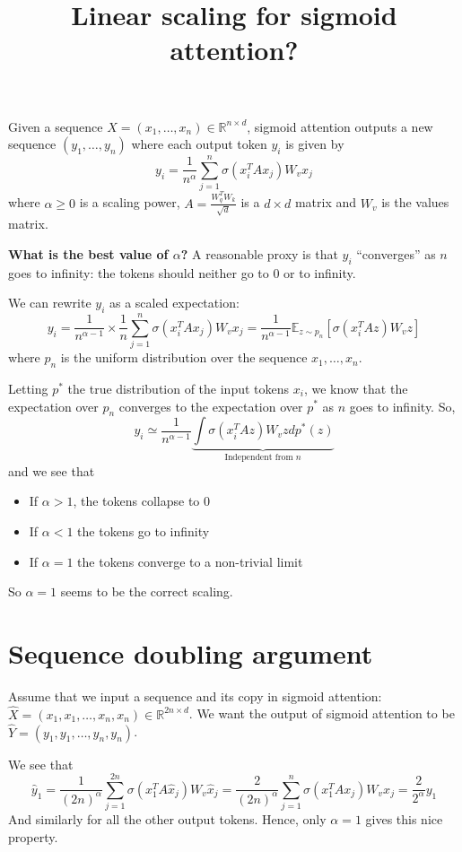 \documentclass{article}
\title{Linear scaling for sigmoid attention?}
\author{}
\date{}
\begin{document}
\maketitle



Given a sequence $X = (x_1, \dots, x_n)\in\mathbb{R}^{n\times d}$, sigmoid attention outputs a new sequence $(y_1, \dots, y_n)$ where each output token $y_i$ is given by 
$$
y_i = \frac1{n^\alpha}\sum_{j=1}^n\sigma(x_i^TAx_j)W_vx_j
$$
where $\alpha\geq0$ is a scaling power, $A = \frac{W_q^TW_k}{\sqrt{d}}$ is a $d\times d$ matrix and $W_v$ is the values matrix.

\textbf{What is the best value of $\alpha$?}
A reasonable proxy is that $y_i$ ``converges'' as $n$ goes to infinity: the tokens should neither go to $0$ or to infinity.

We can rewrite $y_i$ as a scaled expectation:
$$
y_i = \frac1{n^{\alpha-1}}\times \frac1n\sum_{j=1}^n\sigma(x_i^TAx_j)W_vx_j = \frac1{n^{\alpha-1}}\mathbb{E}_{z\sim p_n}\left[\sigma(x_i^TAz)W_vz\right]
$$
where $p_n$ is the uniform distribution over the sequence $x_1, \dots, x_n$.

Letting $p^*$ the true distribution of the input tokens $x_i$, we know that the expectation over $p_n$ converges to the expectation over $p^*$ as $n$ goes to infinity. So, 
$$
y_i\simeq \frac1{n^{\alpha-1}} \underbrace{\int\sigma(x_i^TAz)W_vz dp^*(z)}_{\text{Independent from }n}
$$
and we see that
\begin{itemize}
    \item If $\alpha > 1$, the tokens collapse to 0
    \item If $\alpha < 1$ the tokens go to infinity
    \item If $\alpha=1$ the tokens converge to a non-trivial limit
\end{itemize}
So $\alpha=1$ seems to be the correct scaling.

\section{Sequence doubling argument}

Assume that we input a sequence and its copy in sigmoid attention: $\hat{X} = (x_1, x_1, \dots, x_n, x_n) \in \mathbb{R}^{2n \times d}$.
We want the output of sigmoid attention to be $\hat{Y} = (y_1, y_1, \dots, y_n, y_n)$.

We see that 
$$
\hat{y}_1 = \frac{1}{(2n)^\alpha}\sum_{j=1}^{2n}\sigma(x_1^TA\hat{x}_j)W_v\hat{x}_j = \frac{2}{(2n)^\alpha}\sum_{j=1}^{n}\sigma(x_1^TAx_j)W_vx_j = \frac2{2^\alpha}y_1
$$
And similarly for all the other output tokens. Hence, only $\alpha=1$ gives this nice property.
\end{document}
